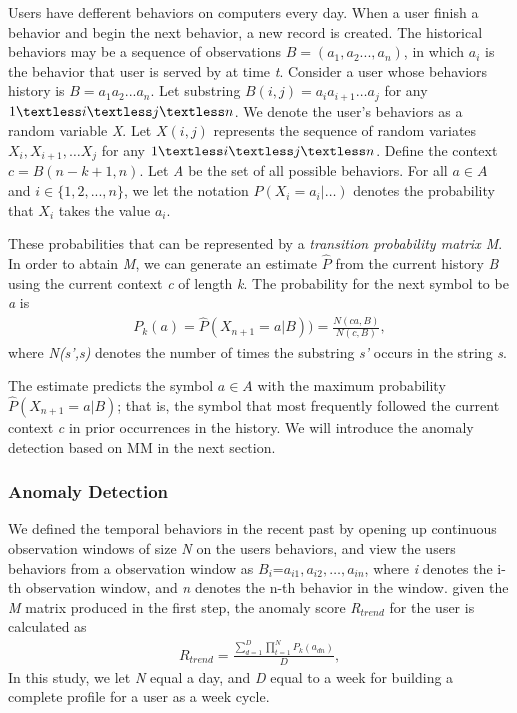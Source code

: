 \documentclass[conference]{IEEEtran}
\begin{document}
Users have defferent behaviors on computers every day. When a user finish a behavior and begin the next behavior, a new record is created. 
The historical behaviors may be a sequence of observations \emph{$B=(a_1,a_2...,a_n)$}, in which \emph{$a_i$} is the behavior that user is served by at time \emph{t}. 
Consider a user whose behaviors history is \emph{$B = a_1a_2...a_n.$}
Let substring \emph{$B(i, j) = a_ia_{i+1}\ldots a_j$} for any \emph{$1 \textless i \textless j \textless n$}.
 We denote the user’s behaviors as a random variable \emph{X}. Let \emph{$X(i,j)$} represents the sequence of random variates \emph{$X_i, X_{i+1},\ldots X_j$} for any \emph{$1\textless i \textless j \textless n$}. Define the context \emph{$c = B(n-k+1,n)$}. Let \emph{A} be the set of all possible behaviors. 
For all \emph{$a \in A $} and \emph{$i \in \{1,2,. . ., n\}$}, we let the notation \emph{$P(X_i = a_i|\ldots)$} denotes the probability that \emph{$X_i$} takes the value \emph{$a_i$}.

These probabilities that  can be represented by a \emph{transition
probability matrix M}. 
In order to abtain \emph{M}, we can generate an estimate \emph{$\hat P$} from the current history \emph{B} using the current context \emph{c} of length \emph{k}. The probability for the next symbol to be \emph{a} is
\begin{align}
	P_k(a)=\hat P(X_{n+1}=a|B))= \frac {N(ca,B)}{N(c,B)},
\end{align}
where \emph{N(s',s)} denotes the number of times the substring \emph{s'} occurs in the string \emph{s}.

The estimate predicts the symbol \emph{$a \in A$} with the maximum probability \emph{$\hat P(X_{n+1}=a|B)$}; that is, the symbol that most frequently followed the current context \emph{c} in prior occurrences in the history. We will introduce the anomaly detection based on MM in the next section.


\subsubsection{Anomaly Detection}


We defined the temporal behaviors in the recent past by opening up continuous observation windows of size \emph{N} on the users behaviors, and view the users behaviors from a observation window as \emph{$B_i$}=\emph{$a_{i1},a_{i2},\dots,a_{in}$}, where \emph{i} denotes the i-th observation window, and \emph{n} denotes the n-th behavior in the window.
given the \emph{M} matrix produced in the first step, the anomaly score \emph{R$_{trend}$} for the user is calculated as
\begin{align}
R_{trend}=\frac{\sum_{d=1}^D \prod_{t=1}^N P_k(a_{dn})}{D},
\end{align}
In this study, we let \emph{N} equal a day, and \emph{D} equal to a week for building a complete profile for a user as a week cycle.
\end{document}
